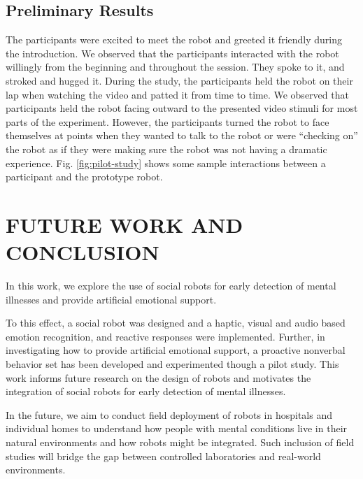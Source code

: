 \documentclass[letterpaper, 10 pt, conference]{ieeeconf}  %
\begin{document}

\subsection{Preliminary Results}
The participants were excited to meet the robot and greeted it friendly during the introduction.
We observed that the participants interacted with the robot willingly from the beginning and throughout the session. They spoke to it, and stroked and hugged it. During the study, the participants held the robot on their lap when watching the video and patted it from time to time. We observed that participants held the robot facing outward to the presented video stimuli for most parts of the experiment. However, the participants turned the robot to face themselves at points when they wanted to talk to the robot or were ``checking on'' the robot as if they were making sure the robot was not having a dramatic experience. Fig. \ref{fig:pilot-study} shows some sample interactions between a participant and the prototype robot. 

\section{FUTURE WORK AND CONCLUSION} %
In this work, we explore the use of social robots for early detection of mental illnesses and provide artificial emotional support. 

To this effect, a social robot was designed and a haptic, visual and audio based emotion recognition, and reactive responses were implemented. Further, in investigating how to provide artificial emotional support, a proactive nonverbal behavior set has been developed and experimented though a pilot study. This work informs future research on the design of robots and motivates the integration of social robots for early detection of mental illnesses. 

In the future, we aim to conduct field deployment of robots in hospitals and individual homes to understand how people with mental conditions live in their natural environments and how robots might be integrated. Such inclusion of field studies will bridge the gap between controlled laboratories and real-world environments. 
\end{document}
